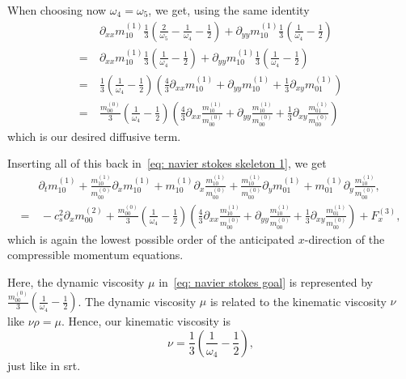 When choosing now $\omega_4=\omega_5$, we get, using the same identity
\begin{align}
  \nonumber
  &\partial_{xx} m_{10}^{(1)} \frac{1}{3} \left(
    \frac{2}{\omega_5}
    - \frac{1}{\omega_4}
    - \frac{1}{2}
  \right)
  + \partial_{yy} m_{10}^{(1)} \frac{1}{3}\left(
    \frac{1}{\omega_4}
    - \frac{1}{2}
  \right)
  \\=\
  \nonumber
  &\partial_{xx} m_{10}^{(1)} \frac{1}{3} \left(
    \frac{1}{\omega_4}
    - \frac{1}{2}
  \right)
  + \partial_{yy} m_{10}^{(1)} \frac{1}{3}\left(
    \frac{1}{\omega_4}
    - \frac{1}{2}
  \right)
  \\=\ &
  \nonumber
  \frac{1}{3}\left(
    \frac{1}{\omega_4}
    - \frac{1}{2}
  \right) \left(\frac{4}{3}\partial_{xx} m_{10}^{(1)} + \partial_{yy} m_{10}^{(1)} + \frac{1}{3}\partial_{xy} m_{01}^{(1)}\right)
  \\=\ &
  \label{eq: diffusive final}
  \frac{m_{00}^{(0)}}{3}\left(
    \frac{1}{\omega_4}
    - \frac{1}{2}
  \right) \left(\frac{4}{3}\partial_{xx} \frac{m_{10}^{(1)}}{m_{00}^{(0)}}
  + \partial_{yy} \frac{m_{10}^{(1)}}{m_{00}^{(0)}} + \frac{1}{3}\partial_{xy} \frac{m_{01}^{(1)}}{m_{00}^{(0)}}\right)
\end{align}
which is our desired diffusive term.

Inserting all of this back in~\eqref{eq: navier stokes skeleton 1}, we get
\begin{align}
  \nonumber
& \partial_t m_{10}^{(1)}
+\frac{ m_{10}^{{(1)}} }{m_{00}^{(0)}} \partial_x  m_{10}^{{(1)}}
+  m_{10}^{{(1)}} \partial_x \frac{ m_{10}^{{(1)}} }{m_{00}^{(0)}}
+ \frac{ m_{10}^{(1)}}{m_{00}^{(0)}}\partial_y m_{01}^{(1)}
+ m_{01}^{(1)}\partial_y \frac{ m_{10}^{(1)}}{m_{00}^{(0)}},
\\=&\,
- c_s^2 \partial_x  m_{00}^{(2)}
+ \frac{m_{00}^{(0)}}{3}\left(
    \frac{1}{\omega_4}
    - \frac{1}{2}
  \right) \left(\frac{4}{3}\partial_{xx} \frac{m_{10}^{(1)}}{m_{00}^{(0)}}
  + \partial_{yy} \frac{m_{10}^{(1)}}{m_{00}^{(0)}} + \frac{1}{3}\partial_{xy} \frac{m_{01}^{(1)}}{m_{00}^{(0)}}\right)
+ F_x^{(3)},
\label{eq: navier stokes derived}
\end{align}
which is again the lowest possible order of the anticipated $x$-direction of the compressible momentum equations.

Here, the dynamic viscosity $\mu$ in~\eqref{eq: navier stokes goal} is represented by $\frac{m_{00}^{(0)}}{3}\left(\frac{1}{\omega_4} - \frac{1}{2}\right)$.
The dynamic viscosity $\mu$  is related to the kinematic viscosity $\nu$ like $\nu\rho=\mu$.
Hence, our kinematic viscosity is
\begin{equation*}
  \nu = \frac{1}{3}\left(
      \frac{1}{\omega_4}
      - \frac{1}{2}
    \right),
\end{equation*}
just like in \gls{srt}.

